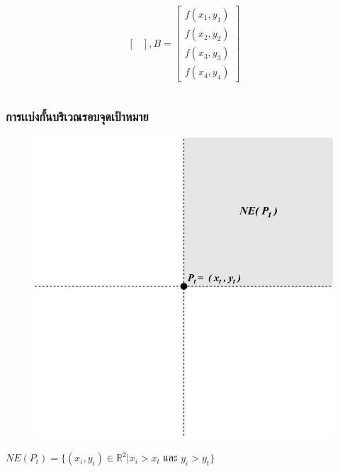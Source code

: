 \documentclass[12pt,aspectratio=169]{beamer}
\begin{document}
\begin{frame}
\begin{columns}
\begin{column}{0.4\textwidth}
\[\begin{bmatrix}
               \end{bmatrix}
               ,
               B
               =\begin{bmatrix}
                  f(x_1,y_1) \\
                  f(x_2,y_2) \\
                  f(x_3,y_3) \\
                  f(x_4,y_4)
               \end{bmatrix}
        \]
            \end{column}
            \end{columns}
\end{frame}
    
\begin{frame}
\frametitle{การเเบ่งกั้นบริเวณรอบจุดเป้าหมาย}
\begin{center}
                \begin{figure}
                    \includegraphics[scale=0.5]{img/NEP_t.pdf}
                \end{figure}
               $ NE(P_t) = \{(x_{i} , y_{i}) \in \mathbb{R}^2 | x_{i} > x_{t} \text{ และ } y_{i} > y_{t}\} $
            \end{center}
\end{frame}
\end{document}
